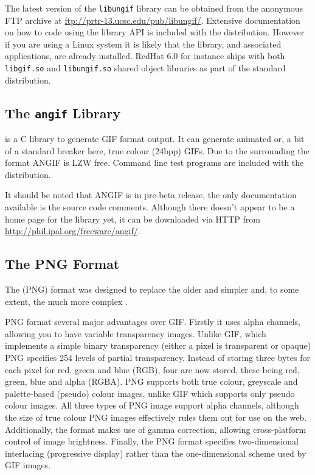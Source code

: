 \documentclass[twoside,11pt]{starlink}
\begin{document}
The latest version of the \texttt{libungif} library can be obtained from
the anonymous FTP archive at \url{ftp://prtr-13.ucsc.edu/pub/libungif/}.
Extensive documentation on how to code using the library API is
included with the distribution. However if you are using a Linux
system it is likely that the library, and associated applications, are
already installed. RedHat 6.0 for instance ships with both \texttt{libgif.so} and \texttt{libungif.so} shared object libraries as part of
the standard distribution.

\subsection{The \texttt{angif} Library\label{sc15_libangif}}

 is a C
library to generate GIF format output. It can generate animated or, a
bit of a standard breaker here, true colour (24bpp) GIFs. Due to the
 surrounding the format ANGIF
is LZW free. Command line test programs are included with the
distribution.

It should be noted that ANGIF is in pre-beta release, the only
documentation available is the source code comments. Although
there doesn't appear to be a home page for the library yet, it can be
downloaded via HTTP from \url{http://phil.ipal.org/freeware/angif/}.

\subsection{The PNG Format\label{sc15_libpng}}

The  (PNG) format was designed to
replace the older and simpler  and,
to some extent, the much more complex .

PNG format several major advantages over GIF. Firstly it uses alpha
channels, allowing you to have variable transparency images. Unlike
GIF, which implements a simple binary transparency (either a pixel is
transparent or opaque) PNG specifies 254 levels of partial
transparency. Instead of storing three bytes for each pixel for red,
green and blue (RGB), four are now stored, these being red, green,
blue and alpha (RGBA). PNG supports both true colour, greyscale and
palette-based (pseudo) colour images, unlike GIF which supports only
pseudo colour images. All three types of PNG image support alpha
channels, although the size of true colour PNG images effectively
rules them out for use on the web. Additionally, the format makes use
of gamma correction, allowing cross-platform control of image
brightness. Finally, the PNG format specifies two-dimensional
interlacing (progressive display) rather than the one-dimensional
scheme used by GIF images.
\end{document}
